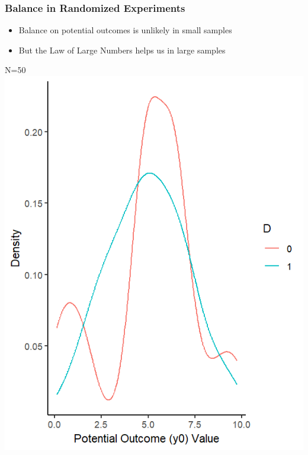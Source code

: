 \documentclass[xcolor=x11names,compress]{beamer}\usepackage[]{graphicx}\usepackage[]{color}
\makeatletter
\def\maxwidth{ %
  \ifdim\Gin@nat@width>\linewidth
    \linewidth
  \else
    \Gin@nat@width
  \fi
}
\newenvironment{knitrout}{}{} %
\renewcommand{\(}{\begin{columns}}
\renewcommand{\)}{\end{columns}}
\newcommand{\<}[1]{\begin{column}{#1}}
\renewcommand{\>}{\end{column}}
\makeatother
\begin{document}
\begin{frame}
\frametitle{Balance in Randomized Experiments}
\begin{multicols}{2}
\begin{itemize}
\item Balance on potential outcomes is unlikely in small samples
\item But the Law of Large Numbers helps us in large samples
\end{itemize}
\columnbreak
N=50
\begin{knitrout}
\color{fgcolor}
\includegraphics[width=\maxwidth]{figure/balance_N4-1} 

\end{knitrout}
\end{multicols}
\end{frame}
\end{document}
